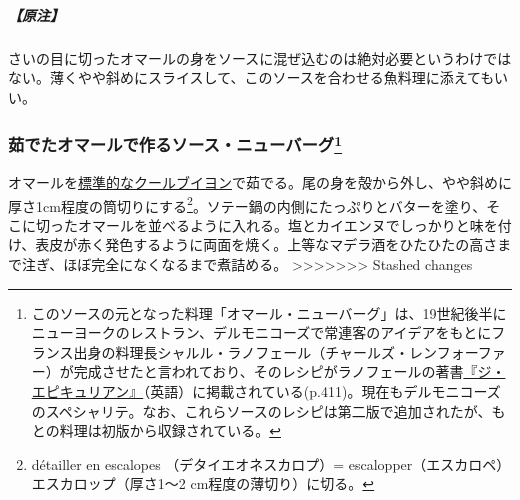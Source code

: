 \begin{recette}
\hypertarget{nota-sauce-new-burg-avec-le-homard-cru}{%
\subparagraph{【原注】}\label{nota-sauce-new-burg-avec-le-homard-cru}}

さいの目に切ったオマールの身をソースに混ぜ込むのは絶対必要というわけではない。薄くやや斜めにスライスして、このソースを合わせる魚料理に添えてもいい。

\hypertarget{sauce-new-burg-avec-le-homard-cuit}{%
\subsubsection[茹でたオマールで作るソース・ニューバーグ]{\texorpdfstring{茹でたオマールで作るソース・ニューバーグ\footnote{このソースの元となった料理「オマール・ニューバーグ」は、19世紀後半にニューヨークのレストラン、デルモニコーズで常連客のアイデアをもとにフランス出身の料理長シャルル・ラノフェール（チャールズ・レンフォーファー）が完成させたと言われており、そのレシピがラノフェールの著書\href{https://archive.org/details/epicureancomplet00ranhrich}{『ジ・エピキュリアン』}（英語）に掲載されている(p.411)。現在もデルモニコーズのスペシャリテ。なお、これらソースのレシピは第二版で追加されたが、もとの料理は初版から収録されている。}}{茹でたオマールで作るソース・ニューバーグ}}\label{sauce-new-burg-avec-le-homard-cuit}}



オマールを\protect\hyperlink{}{標準的なクールブイヨン}で茹でる。尾の身を殻から外し、やや斜めに厚さ1cm程度の筒切りにする\footnote{détailler
  en escalopes （デタイエオネスカロプ）= escalopper（エスカロペ）
  エスカロップ（厚さ1〜2 cm程度の薄切り）に切る。}。ソテー鍋の内側にたっぷりとバターを塗り、そこに切ったオマールを並べるように入れる。塩とカイエンヌでしっかりと味を付け、表皮が赤く発色するように両面を焼く。上等なマデラ酒をひたひたの高さまで注ぎ、ほぼ完全になくなるまで煮詰める。
\textgreater{}\textgreater{}\textgreater{}\textgreater{}\textgreater{}\textgreater{}\textgreater{}
Stashed changes


\end{recette}
